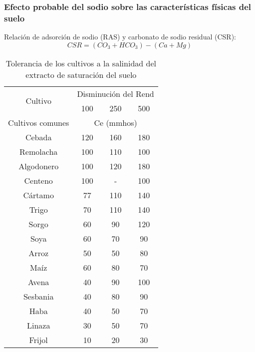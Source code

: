 \subsubsection{Efecto probable del sodio sobre las características físicas del suelo}
Relación de adsorción de sodio (RAS) y carbonato de sodio residual (CSR):
\begin{equation}
    CSR = (CO_3 + HCO_3) -(Ca + Mg)
\end{equation}
\begin{table}[h!]
    \centering
    \begin{tabular}{@{}cccc@{}}
    \toprule
    \multirow{2}{*}{Cultivo} & \multicolumn{3}{c}{Disminución del Rend} \\ \cmidrule(l){2-4} 
                             & 100          & 250         & 500         \\ \cmidrule(r){1-1}
    Cultivos comunes         & \multicolumn{3}{c}{Ce (mmhos)}           \\
    Cebada                   & 120          & 160         & 180         \\
    Remolacha                & 100          & 110         & 100         \\
    Algodonero               & 100          & 120         & 180         \\
    Centeno                  & 100          & -           & 100         \\
    Cártamo                  & 77           & 110         & 140         \\
    Trigo                    & 70           & 110         & 140         \\
    Sorgo                    & 60           & 90          & 120         \\
    Soya                     & 60           & 70          & 90          \\
    Arroz                    & 50           & 50          & 80          \\
    Maíz                     & 60           & 80          & 70          \\
    Avena                    & 40           & 90          & 100         \\
    Sesbania                 & 40           & 80          & 90          \\
    Haba                     & 40           & 50          & 70          \\
    Linaza                   & 30           & 50          & 70          \\
    Frijol                   & 10           & 20          & 30          \\ \bottomrule
    \end{tabular}
    \caption{Tolerancia de los cultivos a la salinidad del extracto de saturación del suelo}
    \label{tabraspa2}
\end{table}

